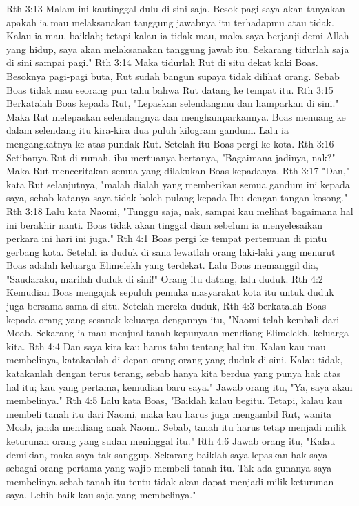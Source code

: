 Rth 3:13  Malam ini kautinggal dulu di sini saja. Besok pagi saya akan tanyakan apakah ia mau melaksanakan tanggung jawabnya itu terhadapmu atau tidak. Kalau ia mau, baiklah; tetapi kalau ia tidak mau, maka saya berjanji demi Allah yang hidup, saya akan melaksanakan tanggung jawab itu. Sekarang tidurlah saja di sini sampai pagi."
Rth 3:14  Maka tidurlah Rut di situ dekat kaki Boas. Besoknya pagi-pagi buta, Rut sudah bangun supaya tidak dilihat orang. Sebab Boas tidak mau seorang pun tahu bahwa Rut datang ke tempat itu.
Rth 3:15  Berkatalah Boas kepada Rut, "Lepaskan selendangmu dan hamparkan di sini." Maka Rut melepaskan selendangnya dan menghamparkannya. Boas menuang ke dalam selendang itu kira-kira dua puluh kilogram gandum. Lalu ia mengangkatnya ke atas pundak Rut. Setelah itu Boas pergi ke kota.
Rth 3:16  Setibanya Rut di rumah, ibu mertuanya bertanya, "Bagaimana jadinya, nak?" Maka Rut menceritakan semua yang dilakukan Boas kepadanya.
Rth 3:17  "Dan," kata Rut selanjutnya, "malah dialah yang memberikan semua gandum ini kepada saya, sebab katanya saya tidak boleh pulang kepada Ibu dengan tangan kosong."
Rth 3:18  Lalu kata Naomi, "Tunggu saja, nak, sampai kau melihat bagaimana hal ini berakhir nanti. Boas tidak akan tinggal diam sebelum ia menyelesaikan perkara ini hari ini juga."
Rth 4:1  Boas pergi ke tempat pertemuan di pintu gerbang kota. Setelah ia duduk di sana lewatlah orang laki-laki yang menurut Boas adalah keluarga Elimelekh yang terdekat. Lalu Boas memanggil dia, "Saudaraku, marilah duduk di sini!" Orang itu datang, lalu duduk.
Rth 4:2  Kemudian Boas mengajak sepuluh pemuka masyarakat kota itu untuk duduk juga bersama-sama di situ. Setelah mereka duduk,
Rth 4:3  berkatalah Boas kepada orang yang sesanak keluarga dengannya itu, "Naomi telah kembali dari Moab. Sekarang ia mau menjual tanah kepunyaan mendiang Elimelekh, keluarga kita.
Rth 4:4  Dan saya kira kau harus tahu tentang hal itu. Kalau kau mau membelinya, katakanlah di depan orang-orang yang duduk di sini. Kalau tidak, katakanlah dengan terus terang, sebab hanya kita berdua yang punya hak atas hal itu; kau yang pertama, kemudian baru saya." Jawab orang itu, "Ya, saya akan membelinya."
Rth 4:5  Lalu kata Boas, "Baiklah kalau begitu. Tetapi, kalau kau membeli tanah itu dari Naomi, maka kau harus juga mengambil Rut, wanita Moab, janda mendiang anak Naomi. Sebab, tanah itu harus tetap menjadi milik keturunan orang yang sudah meninggal itu."
Rth 4:6  Jawab orang itu, "Kalau demikian, maka saya tak sanggup. Sekarang baiklah saya lepaskan hak saya sebagai orang pertama yang wajib membeli tanah itu. Tak ada gunanya saya membelinya sebab tanah itu tentu tidak akan dapat menjadi milik keturunan saya. Lebih baik kau saja yang membelinya."
